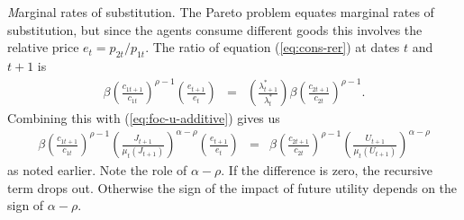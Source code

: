 {\textit Marginal rates of substitution.\/}
The Pareto problem equates marginal rates of substitution,
but since the agents consume different goods this involves the relative price $ e_t = p_{2t} / p_{1t} $.
The ratio of equation (\ref{eq:cons-rer})
at dates $t$ and $t+1$ is
\begin{eqnarray*}
        \beta \left( \frac{c_{1t+1}}{c_{1t}}\right)^{\rho-1}
              \left( \frac{e_{t+1}}{e_t} \right)
              &=&
              \left( \frac{\lambda^*_{t+1}}{\lambda^*_t} \right)
              \beta \left( \frac{c_{2t+1}}{c_{2t}}\right)^{\rho-1} .
\end{eqnarray*}
Combining this with (\ref{eq:foc-u-additive}) gives us
\begin{eqnarray*}
        \beta \left( \frac{c_{1t+1}}{c_{1t}}\right)^{\rho-1}
              \left( \frac{J_{t+1}}{\mu_{t}(J_{t+1})} \right)^{\alpha-\rho}
              \left( \frac{e_{t+1}}{e_t} \right)
              &=&
              \beta \left( \frac{c_{2t+1}}{c_{2t}}\right)^{\rho-1}
              \left( \frac{U_{t+1}}{\mu_{t}(U_{t+1})} \right)^{\alpha-\rho}
\end{eqnarray*}
as noted earlier.
Note the role of  $\alpha - \rho$.
If the difference is zero, the recursive term drops out.
Otherwise the sign of the impact of future utility depends on the sign of $\alpha-\rho$.

